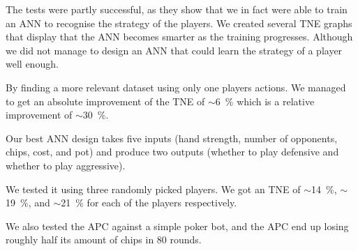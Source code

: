 The tests were partly successful, as they show that we in fact were able to train an ANN to recognise the strategy of the players. We created several TNE graphs that display that the ANN becomes smarter as the training progresses. Although we did not manage to design an ANN that could learn the strategy of a player well enough.

By finding a more relevant dataset using only one players actions. We managed to get an absolute improvement of the TNE of $\sim$6~\% which is a relative improvement of $\sim$30~\%.

Our best ANN design takes five inputs (hand strength, number of opponents, chips, cost, and pot) and produce two outputs (whether to play defensive and whether to play aggressive). 

We tested it using three randomly picked players. We got an TNE of $\sim$14~\%, $\sim$19~\%, and $\sim$21~\% for each of the players respectively.

We also tested the APC against a simple poker bot, and the APC end up losing roughly half its amount of chips in 80 rounds.